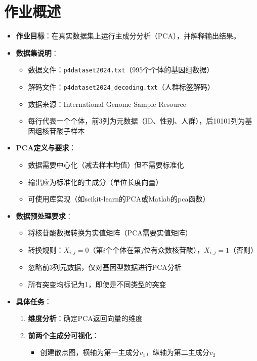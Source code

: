 \documentclass[a4paper]{article}
\begin{document}
\section{作业概述}
{
\begin{itemize}
    \item \textbf{作业目标}：在真实数据集上运行主成分分析（PCA），并解释输出结果。
    \item \textbf{数据集说明}：
    \begin{itemize}
        \item 数据文件：\texttt{p4dataset2024.txt}（995个个体的基因组数据）
        \item 解码文件：\texttt{p4dataset2024\_decoding.txt}（人群标签解码）
        \item 数据来源：International Genome Sample Resource
        \item 每行代表一个个体，前3列为元数据（ID、性别、人群），后10101列为基因组核苷酸子样本
    \end{itemize}
    \item \textbf{PCA定义与要求}：
    \begin{itemize}
        \item 数据需要中心化（减去样本均值）但不需要标准化
        \item 输出应为标准化的主成分（单位长度向量）
        \item 可使用库实现（如scikit-learn的PCA或Matlab的pca函数）
    \end{itemize}
    \item \textbf{数据预处理要求}：
    \begin{itemize}
        \item 将核苷酸数据转换为实值矩阵（PCA需要实值矩阵）
        \item 转换规则：$X_{i,j} = 0$（第$i$个个体在第$j$位有众数核苷酸），$X_{i,j} = 1$（否则）
        \item 忽略前3列元数据，仅对基因型数据进行PCA分析
        \item 所有突变均标记为1，即使是不同类型的突变
    \end{itemize}
    \item \textbf{具体任务}：
    \begin{enumerate}
        \item[(a)] \textbf{维度分析}：确定PCA返回向量的维度
        \item[(b)] \textbf{前两个主成分可视化}：
        \begin{itemize}
            \item 创建散点图，横轴为第一主成分$v_1$，纵轴为第二主成分$v_2$

\end{itemize}
\end{enumerate}
\end{itemize}}
\end{document}
